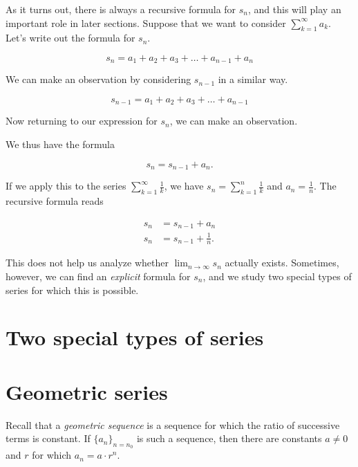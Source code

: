 \documentclass{ximera}
\begin{document}
As it turns out, there is always a recursive formula for $s_n$, and this will play an important role in later sections.  Suppose that we want to consider $\sum_{k=1}^{\infty} a_k$.  Let's write out the formula for $s_n$.

\[
s_n = a_1+a_2+a_3+\ldots+a_{n-1}+a_n
\]

We can make an observation by considering $s_{n-1}$ in a similar way.

\[
s_{n-1} = a_1+a_2+a_3+\ldots+a_{n-1}
\]

Now returning to our expression for $s_n$, we can make an observation. 
\begin{image}
  \end{image}

We thus have the formula 

\[
s_n = s_{n-1}+a_n.
\]

If we apply this to the series $\sum_{k=1}^{\infty} \frac{1}{k}$, we have $s_n = \sum_{k=1}^n \frac{1}{k}$ and $a_n = \frac{1}{n}$.  The recursive formula reads 

\begin{align*}
s_n &= s_{n-1} +a_n\\
s_n &= s_{n-1} +  \frac{1}{n}.
\end{align*}

This does not help us analyze whether $\lim_{n \to \infty} s_n$ actually exists.  Sometimes, however, we can find an \emph{explicit} formula for $s_n$, and we study two special types of series for which this is possible.

\section{Two special types of series}



\section{Geometric series}
Recall that a \emph{geometric sequence} is a sequence for which the ratio of successive terms is constant.  If $\{a_n\}_{n=n_0}$ is such a sequence, then there are constants $a \ne 0$ and $r$ for which $a_n = a\cdot r^n$.  
\end{document}

